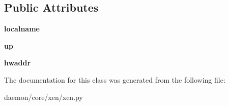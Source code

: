 \subsection*{Public Attributes}
\begin{DoxyCompactItemize}
\item 
\hypertarget{classcore_1_1xen_1_1xen_1_1_xen_v_eth_a9ecbfedf8a147eff260bba830b530710}{{\bfseries localname}}\label{classcore_1_1xen_1_1xen_1_1_xen_v_eth_a9ecbfedf8a147eff260bba830b530710}

\item 
\hypertarget{classcore_1_1xen_1_1xen_1_1_xen_v_eth_a0e5b549754f30318b842ba1fe0ec752c}{{\bfseries up}}\label{classcore_1_1xen_1_1xen_1_1_xen_v_eth_a0e5b549754f30318b842ba1fe0ec752c}

\item 
\hypertarget{classcore_1_1xen_1_1xen_1_1_xen_v_eth_a0249bc888bda1498be43d394abc3ec42}{{\bfseries hwaddr}}\label{classcore_1_1xen_1_1xen_1_1_xen_v_eth_a0249bc888bda1498be43d394abc3ec42}

\end{DoxyCompactItemize}


The documentation for this class was generated from the following file\+:\begin{DoxyCompactItemize}
\item 
daemon/core/xen/xen.\+py\end{DoxyCompactItemize}
